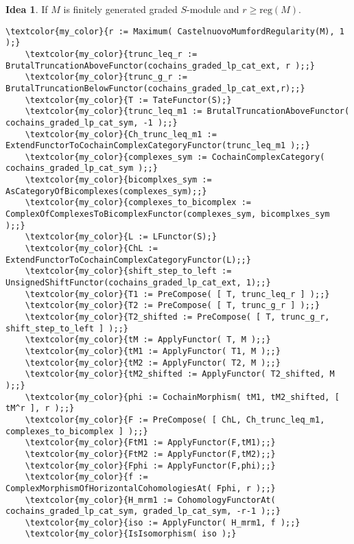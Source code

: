 \documentclass[16pt,a4paper]{extarticle}
\theoremstyle{definition}
\newtheorem{idea}{Idea}
\theoremstyle{theorem}
\begin{document}
    
    \begin{idea}
        If $M$ is finitely generated graded $S$-module and $r\geq\mathrm{reg}(M)$.
    \end{idea}
    \begin{Verbatim}[commandchars=\\\{\}, fontseries=b, frame=single, label=Gap Code, framerule=0.5mm, rulecolor=\color{rule_color} ]
    \textcolor{my_color}{r := Maximum( CastelnuovoMumfordRegularity(M), 1 );}
    \textcolor{my_color}{trunc_leq_r := BrutalTruncationAboveFunctor(cochains_graded_lp_cat_ext, r );;}
    \textcolor{my_color}{trunc_g_r := BrutalTruncationBelowFunctor(cochains_graded_lp_cat_ext,r);;}
    \textcolor{my_color}{T := TateFunctor(S);}
    \textcolor{my_color}{trunc_leq_m1 := BrutalTruncationAboveFunctor( cochains_graded_lp_cat_sym, -1 );;}
    \textcolor{my_color}{Ch_trunc_leq_m1 := ExtendFunctorToCochainComplexCategoryFunctor(trunc_leq_m1 );;}
    \textcolor{my_color}{complexes_sym := CochainComplexCategory( cochains_graded_lp_cat_sym );;}
    \textcolor{my_color}{bicomplxes_sym := AsCategoryOfBicomplexes(complexes_sym);;}
    \textcolor{my_color}{complexes_to_bicomplex := ComplexOfComplexesToBicomplexFunctor(complexes_sym, bicomplxes_sym );;}
    \textcolor{my_color}{L := LFunctor(S);}
    \textcolor{my_color}{ChL := ExtendFunctorToCochainComplexCategoryFunctor(L);;}
    \textcolor{my_color}{shift_step_to_left := UnsignedShiftFunctor(cochains_graded_lp_cat_ext, 1);;}
    \textcolor{my_color}{T1 := PreCompose( [ T, trunc_leq_r ] );;}
    \textcolor{my_color}{T2 := PreCompose( [ T, trunc_g_r ] );;}    
    \textcolor{my_color}{T2_shifted := PreCompose( [ T, trunc_g_r, shift_step_to_left ] );;}
    \textcolor{my_color}{tM := ApplyFunctor( T, M );;}
    \textcolor{my_color}{tM1 := ApplyFunctor( T1, M );;}
    \textcolor{my_color}{tM2 := ApplyFunctor( T2, M );;}
    \textcolor{my_color}{tM2_shifted := ApplyFunctor( T2_shifted, M );;}
    \textcolor{my_color}{phi := CochainMorphism( tM1, tM2_shifted, [ tM^r ], r );;}
    \textcolor{my_color}{F := PreCompose( [ ChL, Ch_trunc_leq_m1, complexes_to_bicomplex ] );;}
    \textcolor{my_color}{FtM1 := ApplyFunctor(F,tM1);;}
    \textcolor{my_color}{FtM2 := ApplyFunctor(F,tM2);;}
    \textcolor{my_color}{Fphi := ApplyFunctor(F,phi);;}
    \textcolor{my_color}{f := ComplexMorphismOfHorizontalCohomologiesAt( Fphi, r );;}
    \textcolor{my_color}{H_mrm1 := CohomologyFunctorAt( cochains_graded_lp_cat_sym, graded_lp_cat_sym, -r-1 );;}
    \textcolor{my_color}{iso := ApplyFunctor( H_mrm1, f );;}
    \textcolor{my_color}{IsIsomorphism( iso );}
    
\end{Verbatim}
\end{document}
